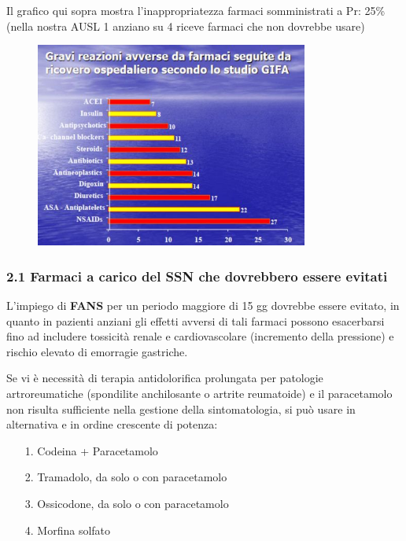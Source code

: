   Il grafico qui sopra mostra l'inappropriatezza farmaci somministrati a
  Pr: 25\% (nella nostra AUSL 1 anziano su 4 riceve farmaci che non
  dovrebbe usare)

\begin{figure}[!ht]
\centering
	\includegraphics[width=0.8\textwidth]{37/image3.jpg}
	\end{figure}

  \subsubsection{2.1 Farmaci a carico del SSN che dovrebbero essere evitati}

  L'impiego di \textbf{FANS} per un periodo maggiore di 15 gg dovrebbe
  essere evitato, in quanto in pazienti anziani gli effetti avversi di
  tali farmaci possono esacerbarsi fino ad includere tossicità renale e
  cardiovascolare (incremento della pressione) e rischio elevato di
  emorragie gastriche.

  Se vi è necessità di terapia antidolorifica prolungata per patologie
  artroreumatiche (spondilite anchilosante o artrite reumatoide) e il
  paracetamolo non risulta sufficiente nella gestione della
  sintomatologia, si può usare in alternativa e in ordine crescente di
  potenza:

\begin{itemize}
\item[1.]
  Codeina + Paracetamolo
\item[2.]
  Tramadolo, da solo o con paracetamolo
\item[3.]
  Ossicodone, da solo o con paracetamolo
\item[4.]
  Morfina solfato
\end{itemize}

